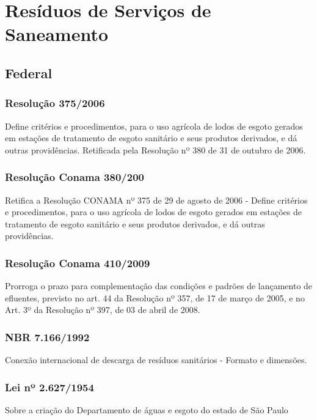 \section{Resíduos de Serviços de Saneamento}

\begin{subapend}
	\subsection{Federal}
	\begin{subsubapend}
		\item \subsubsection{Resolução 375/2006}
		Define critérios e procedimentos, para o uso agrícola de lodos de esgoto gerados em estações de tratamento de esgoto sanitário e seus produtos derivados, e dá outras providências. Retificada pela Resolução nº 380 de 31 de outubro de 2006.
		\subsubsection{Resolução Conama 380/200}
		Retifica a Resolução CONAMA nº 375 de 29 de agosto de 2006 - Define critérios e procedimentos, para o uso agrícola de lodos de esgoto gerados em estações de tratamento de esgoto sanitário e seus produtos derivados, e dá outras providências.
		\subsubsection{Resolução Conama 410/2009}
		Prorroga o prazo para complementação das condições e padrões de lançamento de efluentes, previsto no art. 44 da Resolução nº 357, de 17 de março de 2005, e no Art. 3º da Resolução nº 397, de 03 de abril de 2008.
		\subsubsection{NBR 7.166/1992}
		Conexão internacional de descarga de resíduos sanitários - Formato e dimensões.
		\subsubsection{Lei nº 2.627/1954}
		Sobre a criação do Departamento de águas e esgoto do estado de São Paulo
	\end{subsubapend}
\end{subapend}

